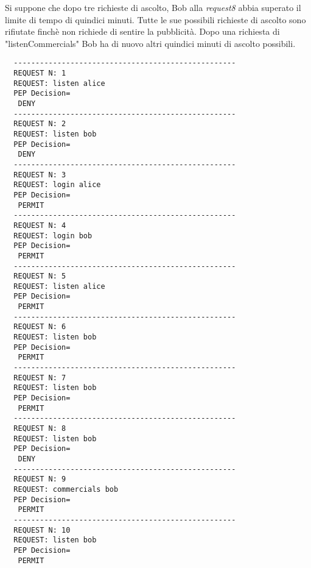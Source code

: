 Si suppone che dopo tre richieste di ascolto, Bob alla \emph{request8} abbia superato il limite di tempo di quindici minuti.
Tutte le sue possibili richieste di ascolto sono rifiutate finchè non richiede di sentire la pubblicità. Dopo una richiesta
di "listenCommercials" Bob ha di nuovo altri quindici minuti di ascolto possibili.

\begin{verbatim}
  ---------------------------------------------------
  REQUEST N: 1
  REQUEST: listen alice
  PEP Decision=
   DENY
  ---------------------------------------------------
  REQUEST N: 2
  REQUEST: listen bob
  PEP Decision=
   DENY
  ---------------------------------------------------
  REQUEST N: 3
  REQUEST: login alice
  PEP Decision=
   PERMIT
  ---------------------------------------------------
  REQUEST N: 4
  REQUEST: login bob
  PEP Decision=
   PERMIT
  ---------------------------------------------------
  REQUEST N: 5
  REQUEST: listen alice
  PEP Decision=
   PERMIT
  ---------------------------------------------------
  REQUEST N: 6
  REQUEST: listen bob
  PEP Decision=
   PERMIT
  ---------------------------------------------------
  REQUEST N: 7
  REQUEST: listen bob
  PEP Decision=
   PERMIT
  ---------------------------------------------------
  REQUEST N: 8
  REQUEST: listen bob
  PEP Decision=
   DENY
  ---------------------------------------------------
  REQUEST N: 9
  REQUEST: commercials bob
  PEP Decision=
   PERMIT
  ---------------------------------------------------
  REQUEST N: 10
  REQUEST: listen bob
  PEP Decision=
   PERMIT
\end{verbatim}

